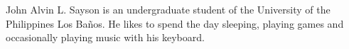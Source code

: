 \documentclass[journal]{./IEEE/IEEEtran}
\begin{document}


\nocite{*}

\begin{biography}
{John Alvin L. Sayson} is an undergraduate student of the University of the Philippines Los Ba\~{n}os. He likes to spend the day sleeping, playing games and occasionally playing music with his keyboard.
\end{biography}
\end{document}
